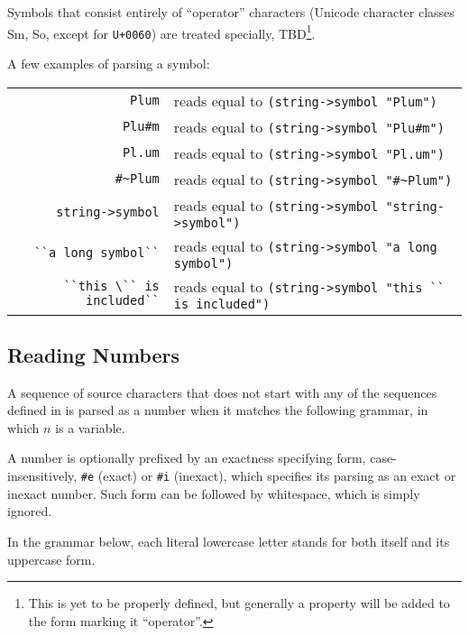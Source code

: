 Symbols that consist entirely of ``operator'' characters (Unicode character classes Sm, So, except for \lstinline!U+0060!) are treated specially, TBD\footnote{This is yet to be properly defined, but generally a property will be added to the form marking it ``operator''.}.

\example A few examples of parsing a symbol:

\begin{tabular}{ r l }
  \lstinline!Plum! & reads equal to \lstinline!(string->symbol "Plum")! \\
  \lstinline!Plu#m! & reads equal to \lstinline!(string->symbol "Plu#m")! \\
  \lstinline!Pl.um! & reads equal to \lstinline!(string->symbol "Pl.um")! \\
  \lstinline!#~Plum! & reads equal to \lstinline!(string->symbol "#~Plum")! \\
  \lstinline!string->symbol! & reads equal to \lstinline!(string->symbol "string->symbol")! \\
  \lstinline!``a long symbol``! & reads equal to \lstinline!(string->symbol "a long symbol")! \\
  \lstinline[deletekeywords={is}]!``this \`` is included``! & reads equal to \lstinline[deletekeywords={is}]!(string->symbol "this `` is included")! \\
\end{tabular}

\pagebreak 




\subsection{Reading Numbers}
\label{subsec:aml-base-lang-reader-numbers}

A sequence of source characters that does not start with any of the sequences defined in  is parsed as a number when it matches the following grammar, in which $n$ is a variable.

A number is optionally prefixed by an exactness specifying form, case-insensitively, \lstinline!#e! (exact) or \lstinline!#i! (inexact), which specifies its parsing as an exact or inexact number. Such form can be followed by whitespace, which is simply ignored.


In the grammar below, each literal lowercase letter stands for both itself and its uppercase form.

